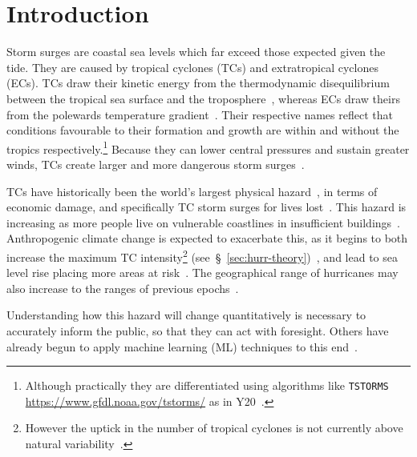 \section{Introduction}
\label{sec:1_Introduction}


Storm surges are coastal sea levels which far exceed those
expected given the tide.
They are caused by tropical cyclones
(TCs) and extratropical cyclones (ECs).
TCs draw their kinetic energy from the thermodynamic disequilibrium between
the tropical sea surface and the troposphere~\cite{emanuel1987dependence},
whereas ECs draw theirs from the
polewards temperature gradient~\cite{lorenz1960energy, holton2004introduction}.
Their respective names reflect that conditions favourable
to their formation and growth are within and without the tropics respectively.\footnote{
Although practically they are differentiated using algorithms like \texttt{TSTORMS}
\url{https://www.gfdl.noaa.gov/tstorms/} as in Y20~\cite{ZannaPreprint}.}
Because they can lower central pressures and sustain greater winds,
TCs create larger and more dangerous storm surges~\cite{emanuel2005divine}.

TCs have historically been the
world's largest physical hazard~\cite{shultz2005epidemiology},
in terms of economic damage, and specifically TC storm surges for lives lost~\cite{zhang2009tropical}.
This hazard is increasing as more people live on vulnerable coastlines
in insufficient buildings~\cite{emanuel2005divine}.
Anthropogenic climate change is expected to exacerbate this,
as it begins to both increase the maximum TC intensity\footnote{However the uptick
in the number of tropical cyclones is not currently above
 natural variability~\cite{mendelsohn2012impact}.}
(see~§~\ref{sec:hurr-theory})~\cite{emanuel2008hurricanes,emanuel2017will},
and lead to sea level rise placing more areas at risk~\cite{SROCC}.
The geographical range of hurricanes may also increase
to the ranges of previous epochs~\cite{fedorov2010tropical}.

Understanding how this hazard will change quantitatively
is necessary to accurately
inform the public,
so that they can act with foresight.
Others have already begun to apply machine learning (ML) techniques to this
end~\cite{kulp2019new, kulp2018coastaldem, tadesse2020data}.





